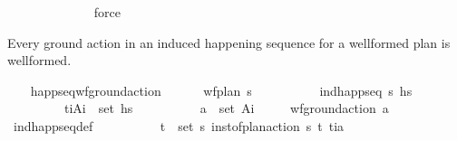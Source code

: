 \begin{isabellebody}
\ \ \ \ \ \ \ \ \ \ \ \ \isamarkupfalse%
\ force\ \isanewline
\ \ \ \ \ \ \ \ \isamarkupfalse%
\isanewline
\ \ \ \ \ \ \isamarkupfalse%
\isanewline
\ \ \isamarkupfalse%
%
\endisatagproof
{\isafoldproof}%
%
\isadelimproof
%
\endisadelimproof
%
\begin{isamarkuptext}%
Every ground action in an induced happening sequence for a wellformed plan 
  is wellformed.%
\end{isamarkuptext}\isamarkuptrue%
\ \ \isamarkupfalse%
\ happ{\isacharunderscore}{\kern0pt}seq{\isacharunderscore}{\kern0pt}wf{\isacharunderscore}{\kern0pt}ground{\isacharunderscore}{\kern0pt}action{\isacharcolon}{\kern0pt}\ \isanewline
\ \ \ \ \ {\isachardoublequoteopen}wf{\isacharunderscore}{\kern0pt}plan\ {\isasympi}s{\isachardoublequoteclose}\ \isanewline
\ \ \ \ \ \ \ \ \ {\isachardoublequoteopen}ind{\isacharunderscore}{\kern0pt}happ{\isacharunderscore}{\kern0pt}seq\ {\isasympi}s\ hs{\isachardoublequoteclose}\ \isanewline
\ \ \ \ \ \ \ \ \ {\isachardoublequoteopen}{\isacharparenleft}{\kern0pt}t\isactrlsub i{\isacharcomma}{\kern0pt}A\isactrlsub i{\isacharparenright}{\kern0pt}\ {\isasymin}\ set\ hs{\isachardoublequoteclose}\ \isanewline
\ \ \ \ \ \ \ \ \ {\isachardoublequoteopen}a\ {\isasymin}\ set\ A\isactrlsub i{\isachardoublequoteclose}\isanewline
\ \ \ \ \ {\isachardoublequoteopen}wf{\isacharunderscore}{\kern0pt}ground{\isacharunderscore}{\kern0pt}action\ a{\isachardoublequoteclose}\isanewline
%
\isadelimproof
\ \ \ \ %
\endisadelimproof
%
\isatagproof
{}\isamarkupfalse%
\ ind{\isacharunderscore}{\kern0pt}happ{\isacharunderscore}{\kern0pt}seq{\isacharunderscore}{\kern0pt}def\isanewline
\ \ \isamarkupfalse%
\ {\isacharminus}{\kern0pt}\isanewline
\ \ \ \ \isamarkupfalse%
\ {\isachardoublequoteopen}{\isasymexists}{\isacharparenleft}{\kern0pt}t\isactrlsub {\isasympi}{\isacharcomma}{\kern0pt}{\isasympi}{\isacharparenright}{\kern0pt}\ {\isasymin}\ set\ {\isasympi}s{\isachardot}{\kern0pt}\ inst{\isacharunderscore}{\kern0pt}of{\isacharunderscore}{\kern0pt}plan{\isacharunderscore}{\kern0pt}action\ {\isasympi}s\ {\isacharparenleft}{\kern0pt}t\isactrlsub {\isasympi}{\isacharcomma}{\kern0pt}{\isasympi}{\isacharparenright}{\kern0pt}\ {\isacharparenleft}{\kern0pt}t\isactrlsub i{\isacharcomma}{\kern0pt}a{\isacharparenright}{\kern0pt}{\isachardoublequoteclose}\isanewline
\ \ \ \ \ \ \isamarkupfalse%

\end{isabellebody}
